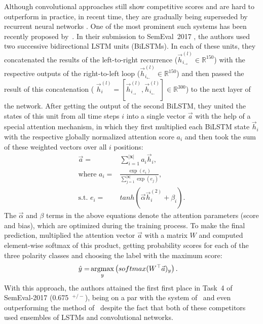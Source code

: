 Although convolutional approaches still show competitive scores and
are hard to outperform in practice, in recent time, they are gradually
being superseded by recurrent neural networks \cite{Xu:16,Wang:15}.
One of the most prominent such systems has been recently proposed
by~\citet{Baziotis:17}.  In their submission to SemEval~2017
\cite{Rosenthal:17}, the authors used two successive bidirectional
LSTM units (BiLSTMs).  In each of these units, they concatenated the
results of the left-to-right recurrence
($\vec{h}^{(l)}_{i_{\rightarrow}}\in\mathbb{R}^{150}$) with the
respective outputs of the right-to-left loop
($\vec{h}^{(l)}_{i_{\leftarrow}}\in\mathbb{R}^{150}$) and then passed
the result of this concatenation ( $\vec{h}_i^{(l)} =
[\vec{h}^{(l)}_{i_{\rightarrow}},
  \vec{h}^{(l)}_{i_{\leftarrow}}]\in\mathbb{R}^{300}$) to the next
layer of the network.  After getting the output of the second BiLSTM,
they united the states of this unit from all time steps $i$ into a
single vector $\vec{a}$ with the help of a special attention
mechanism, in which they first multiplied each BiLSTM state
$\vec{h}_i$ with the respective globally normalized attention score
$a_i$ and then took the sum of these weighted vectors over all $i$
positions:
\begin{align}
  \vec{a} =&
  \sum_{i=1}^{|\mathbf{x}|}a_i\vec{h}_i,\nonumber\\ \mbox{where }a_i
  =&
  \frac{\exp(e_i)}{\sum_{j=1}^{|\mathbf{x}|}\exp(e_j)},\nonumber\\ \textrm{s.t. }e_i
  =& tanh\left(\vec{\alpha}\vec{h}^{(2)}_i + \beta_i\right).
\end{align}\label{eq:cgsa:baziotis-attention}%
The $\vec{\alpha}$ and $\beta$ terms in the above equations denote the
attention parameters (score and bias), which are optimized during the
training process.  To make the final prediction,
\citeauthor{Baziotis:17} multiplied the attention vector $\vec{a}$
with a matrix $W$ and computed element-wise softmax of this product,
getting probability scores for each of the three polarity classes and
choosing the label with the maximum score:
\begin{align}
  \hat{y} =& \argmax_y\left(softmax(W^\top\vec{a})_y\right).
\end{align}
\noindent With this approach, the authors attained the first first
place in Task~4 of SemEval-2017 (0.675~\F{}$^{+/-}$), being on a par
with the system of~\citet{Cliche:17} and even outperforming the method
of~\citet{Rouvier:17} despite the fact that both of these competitors
used ensembles of LSTMs and convolutional networks.

